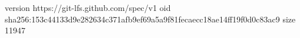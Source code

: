 version https://git-lfs.github.com/spec/v1
oid sha256:153c44133d9e282634c371afb9ef69a5a9f81fecaecc18ae14ff19f0d0c83ac9
size 11947
